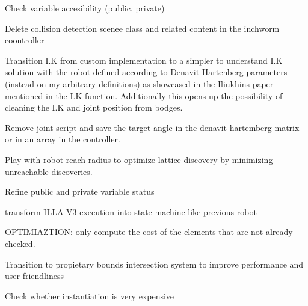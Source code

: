 
\begin{DoxyRefList}
\item[Class \mbox{\hyperlink{class_illa_controller_v3}{Illa\+Controller\+V3}} ]\label{todo__todo000001}%
%
Check variable accesibility (public, private) 



Delete collision detection scenee class and related content in the inchworm coontroller 



Transition I.\+K from custom implementation to a simpler to understand I.\+K solution with the robot defined according to Denavit Hartenberg parameters (instead on my arbitrary definitions) as showcased in the Iliukhin\textquotesingle{}s paper mentioned in the I.\+K function. Additionally this opens up the possibility of cleaning the I.\+K and joint position from bodges. 



Remove joint script and save the target angle in the denavit hartemberg matrix or in an array in the controller. 



Play with robot reach radius to optimize lattice discovery by minimizing unreachable discoveries. 



Refine public and private variable status 



transform ILLA V3 execution into state machine like previous robot 
\item[Member \mbox{\hyperlink{class_illa_graph_node_ab5e3aa47f179ee2d8ad84620cf11db85}{Illa\+Graph\+Node.Draw\+Outgoing\+Edges\+With\+Cost}} (\mbox{\hyperlink{class_illa_graph_node}{Illa\+Graph\+Node}} previous\+Node\+To\+Draw)]\label{todo__todo000002}%
%
OPTIMIAZTION\+: only compute the cost of the elements that are not already checked.  
\item[Class \mbox{\hyperlink{class_illa_node_sensor_script}{Illa\+Node\+Sensor\+Script}} ]\label{todo__todo000003}%
%
Transition to propietary bounds intersection system to improve performance and user friendliness  
\item[Member \mbox{\hyperlink{class_inchworm_robot_controller_a434da4643498bd898d99a63678492ae4}{Inchworm\+Robot\+Controller.Is\+Pose\+Colliding}} (\mbox{\hyperlink{class_pos_j}{PosJ}} Pose\+To\+Check)]\label{todo__todo000004}%
%
Check whether instantiation is very expensive


\end{DoxyRefList}

